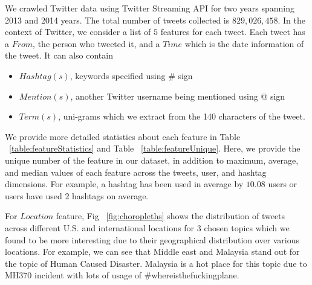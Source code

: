 We crawled Twitter data using Twitter Streaming API for two years spanning 2013 and 2014 years. 
The total number of tweets collected is $829,026,458$. In the context of Twitter, we consider a list of $5$ features for each tweet. Each tweet has a $From$, the person who tweeted it, and a $Time$ which is the date information of the tweet. It can also contain 
\begin{itemize}
\item $Hashtag(s)$, keywords specified using \# sign
\item $Mention(s)$, another Twitter username being mentioned using @ sign
\item $Term(s)$, uni-grams which we extract from the 140 characters of the tweet. %
\end{itemize}
We provide more detailed statistics about each feature in Table ~\ref{table:featureStatistics} and Table ~\ref{table:featureUnique}. Here, we provide the unique number of the feature in our dataset, in addition to maximum, average, and median values of each feature across the tweets, user, and hashtag dimensions. For example, a hashtag has been used in average by $10.08$ users or users have used $2$ hashtags on average.

For $Location$ feature, Fig ~\ref{fig:choropleths} shows the distribution of tweets across different U.S. and international locations for $3$ chosen topics which we found to be more interesting due to their geographical distribution over various locations. For example, we can see that Middle east and Malaysia stand out for the topic of Human Caused Disaster. Malaysia is a hot place for this topic due to MH370 incident with lots of usage of \#whereisthefuckingplane.

